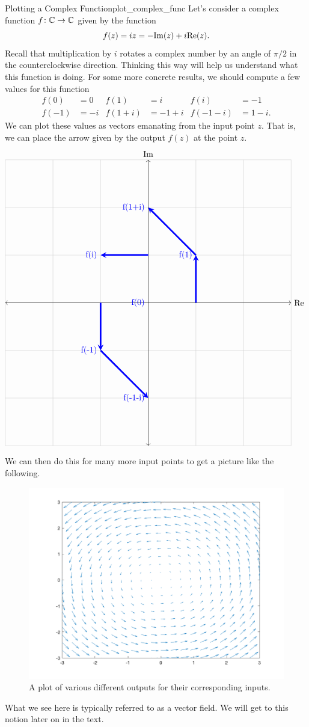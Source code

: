 \begin{ex}{Plotting a Complex Function}{plot_complex_func}
	Let's consider a complex function $f\colon \mathbb{C} \to \mathbb{C}$ given by the function
	\[
		f(z) = iz= -\mathrm{Im}(z)+i\mathrm{Re}(z).
	\]
	Recall that multiplication by $i$ rotates a complex number by an angle of $\pi/2$ in the counterclockwise direction. Thinking this way will help us understand what this function is doing.  For some more concrete results, we should compute a few values for this function
	\begin{align*}
		f(0)&= 0 & f(1)&=i & f(i)&= -1\\
		f(-1)&= -i & f(1+i)&= -1+i & f(-1 -i) &= 1 - i.
	\end{align*}
	We can plot these values as vectors emanating from the input point $z$. That is, we can place the arrow given by the output $f(z)$ at the point $z$.  
	\[
	        \begin{tikzpicture}[scale=2]
	        \draw[thin,gray!40] (-3,-3) grid (3,3);
	        \draw[<->] (-3,0)--(3,0) node[right]{$\RE$};
	        \draw[<->] (0,-3)--(0,3) node[above]{$\IM$};
	        \draw[line width=2pt,blue,-](0,0)--(0,0) node[anchor=east] at (0,0){f(0)};
	        \draw[line width=2pt,blue,-stealth](1,0)--(1,1) node[anchor=east] at (1,1){f(1)};
	        \draw[line width=2pt,blue,-stealth](-1,0)--(-1,-1) node[anchor=east] at (-1,-1){f(-1)};
	        \draw[line width=2pt,blue,-stealth](0,1)--(-1,1) node[anchor=east] at (-1,1){f(i)};
	        \draw[line width=2pt,blue,-stealth](1,1)--(0,2) node[anchor=east] at (0,2){f(1+i)};
	        \draw[line width=2pt,blue,-stealth](-1,-1)--(0,-2) node[anchor=east] at (0,-2){f(-1-i)};
	        \end{tikzpicture}
	  \]
	  We can then do this for many more input points to get a picture like the following.
		\begin{figure}[H]
			\centering
			\includegraphics[width=\textwidth]{Figures_Part_5/complex_function_visual.png}
			\caption{A plot of various different outputs for their corresponding inputs.}
		\end{figure}
		What we see here is typically referred to as a vector field. We will get to this notion later on in the text.
\end{ex}
		
